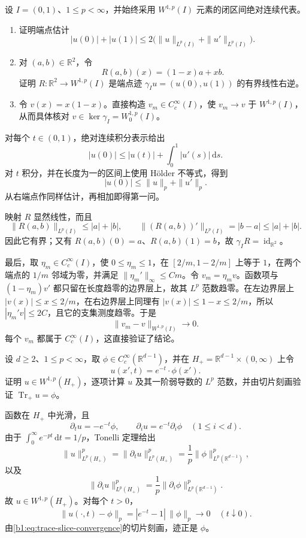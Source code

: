 \begin{exercise}\label{b1:ex:23-interval-affine-trace}
设 \(I=(0,1)\)、\(1\le p<\infty\)，并始终采用 \(W^{1,p}(I)\) 元素的闭区间绝对连续代表。
\begin{enumerate}
 \item 证明端点估计
 \[
  |u(0)|+|u(1)|
  \le 2\bigl(\|u\|_{L^p(I)}+\|u'\|_{L^p(I)}\bigr).
 \]
 \item 对 \((a,b)\in\mathbb R^2\)，令
 \[
  R(a,b)(x)=(1-x)a+xb.
 \]
 证明 \(R:\mathbb R^2\to W^{1,p}(I)\) 是端点迹
 \(\gamma_Iu=(u(0),u(1))\) 的有界线性右逆。
 \item 令 \(v(x)=x(1-x)\)。直接构造 \(v_m\in C_c^\infty(I)\)，使 \(v_m\to v\) 于 \(W^{1,p}(I)\)，从而具体核对 \(v\in\ker\gamma_I=W_0^{1,p}(I)\)。
\end{enumerate}
\end{exercise}
\begin{solution}
对每个 \(t\in(0,1)\)，绝对连续积分表示给出
\[
 |u(0)|\le |u(t)|+\int_0^1|u'(s)|\,\mathrm ds.
\]
对 \(t\) 积分，并在长度为一的区间上使用 Hölder 不等式，得到
\[
 |u(0)|\le\|u\|_p+\|u'\|_p.
\]
从右端点作同样估计，再相加即得第一问。

映射 \(R\) 显然线性，而且
\[
 \|R(a,b)\|_{L^p(I)}\le |a|+|b|,
 \qquad
 \|(R(a,b))'\|_{L^p(I)}=|b-a|\le |a|+|b|.
\]
因此它有界；又有 \(R(a,b)(0)=a\)、\(R(a,b)(1)=b\)，故
\(\gamma_I R=\operatorname{id}_{\mathbb R^2}\)。

最后，取 \(\eta_m\in C_c^\infty(I)\)，使 \(0\le\eta_m\le1\)，在
\([2/m,1-2/m]\) 上等于 \(1\)，在两个端点的 \(1/m\) 邻域为零，并满足
\(\|\eta_m'\|_\infty\le Cm\)。令 \(v_m=\eta_mv\)。函数项与
\((1-\eta_m)v'\) 都只留在长度趋零的边界层上，故其 \(L^p\) 范数趋零。在左边界层上 \(|v(x)|\le x\le2/m\)，在右边界层上同理有
\(|v(x)|\le1-x\le2/m\)，所以 \(|\eta_m'v|\le2C\)，且它的支集测度趋零。于是
\[
 \|v_m-v\|_{W^{1,p}(I)}\longrightarrow0.
\]
每个 \(v_m\) 都属于 \(C_c^\infty(I)\)，这直接验证了结论。
\end{solution}

\begin{exercise}\label{b1:ex:23-half-space-product-trace}
设 \(d\ge2\)、\(1\le p<\infty\)，取
\(\phi\in C_c^\infty(\mathbb R^{d-1})\)，并在
\(H_+=\mathbb R^{d-1}\times(0,\infty)\) 上令
\[
 u(x',t)=e^{-t}\cdot \phi(x').
\]
证明 \(u\in W^{1,p}(H_+)\)，逐项计算 \(u\) 及其一阶弱导数的 \(L^p\) 范数，并由切片刻画验证
\(\operatorname{Tr}_+u=\phi\)。
\end{exercise}
\begin{solution}
函数在 \(H_+\) 中光滑，且
\[
 \partial_tu=-e^{-t}\phi,
 \qquad
 \partial_i u=e^{-t}\partial_i\phi\quad(1\le i<d).
\]
由于 \(\int_0^\infty e^{-pt}\,\mathrm dt=1/p\)，Tonelli 定理给出
\[
 \|u\|_{L^p(H_+)}^p
 =\|\partial_tu\|_{L^p(H_+)}^p
 =\frac1p\|\phi\|_{L^p(\mathbb R^{d-1})}^p,
\]
以及
\[
 \|\partial_i u\|_{L^p(H_+)}^p
 =\frac1p\|\partial_i\phi\|_{L^p(\mathbb R^{d-1})}^p.
\]
故 \(u\in W^{1,p}(H_+)\)。对每个 \(t>0\)，
\[
 \|u(\cdot,t)-\phi\|_p
 =|e^{-t}-1|\,\|\phi\|_p\longrightarrow0
 \quad(t\downarrow0).
\]
由\eqref{b1:eq:trace-slice-convergence}的切片刻画，迹正是 \(\phi\)。
\end{solution}

